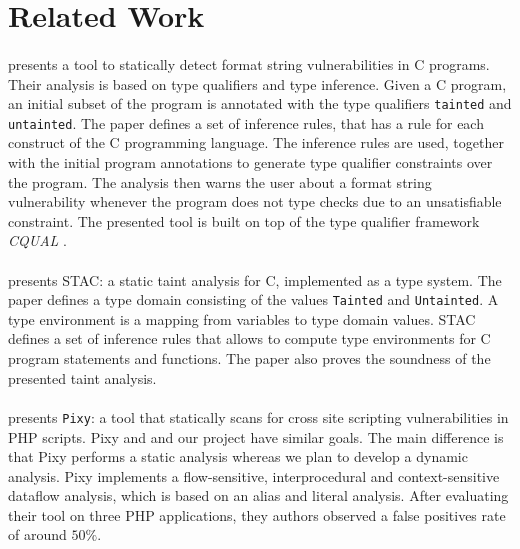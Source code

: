 \section{Related Work}\label{sec:related}

\paragraph{\cite{Shankar:2001:DFS}} presents a tool to statically
detect format string vulnerabilities in C programs. Their analysis
is based on type qualifiers and type inference. Given a C program,
an initial subset of the program is annotated with the type qualifiers
\texttt{tainted} and \texttt{untainted}. The paper defines a set
of inference rules, that has a rule for each construct of
the C programming language. The inference rules are used, together
with the initial program annotations to generate type qualifier
constraints over the program. The analysis then warns the user
about a format string vulnerability whenever the program does not
type checks due to an unsatisfiable constraint. The presented tool
is built on top of the type qualifier framework \textit{CQUAL} 
\cite{Foster:pldi99}.

\paragraph{\cite{Dimitru:2009:STAC}} presents STAC: a static taint
analysis for C, implemented as a type system. The paper defines a type
domain consisting of the values \texttt{Tainted} and \texttt{Untainted}.
A type environment is a mapping from variables to type domain values.
STAC defines a set of inference rules that allows to compute
type environments for C program statements and functions. The paper
also proves the soundness of the presented taint analysis.

\paragraph{\cite{Jovanovic:2006:Pixy}} presents \texttt{Pixy}: a tool
that statically scans for cross site scripting vulnerabilities in PHP
scripts. Pixy and and our project have similar goals. The main
difference is that Pixy performs a static analysis whereas we plan
to develop a dynamic analysis. Pixy implements a flow-sensitive,
interprocedural and context-sensitive dataflow analysis, which
is based on an alias and literal analysis. After evaluating
their tool on three PHP applications, they authors observed 
a false positives rate of around $50\%$.

